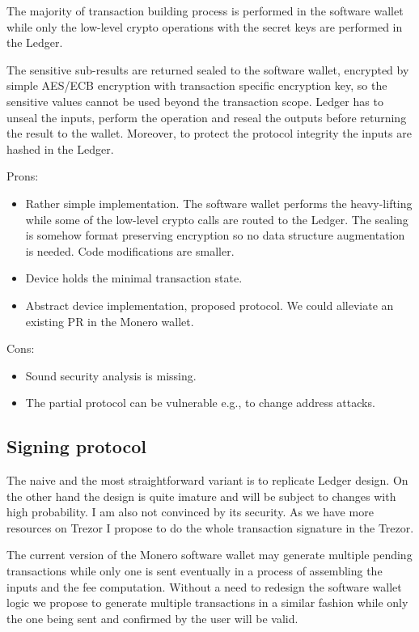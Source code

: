 \documentclass[]{article}
\begin{document}
The majority of transaction building process is performed in the software wallet while only the low-level crypto operations with the secret keys are performed in the Ledger.  

The sensitive sub-results are returned sealed to the software wallet, encrypted by simple AES/ECB encryption with transaction specific encryption key, so the sensitive values cannot be used beyond the transaction scope. Ledger has to unseal the inputs, perform the operation and reseal the outputs before returning the result to the wallet. Moreover, to protect the protocol integrity the inputs are hashed in the Ledger. 

\;
\noindent Prons:
\begin{itemize}
	\item Rather simple implementation. The software wallet performs the heavy-lifting while some of the 
	low-level crypto calls are routed to the Ledger. The sealing is somehow format preserving encryption so no data structure augmentation is needed. Code modifications are smaller.
	\item Device holds the minimal transaction state.
	\item Abstract device implementation, proposed protocol. We could alleviate an existing PR\cite{ledger_pr} in the Monero wallet.
\end{itemize}

\noindent Cons:
\begin{itemize}
	\item Sound security analysis is missing. 
	\item The partial protocol can be vulnerable e.g., to change address attacks.
\end{itemize}

\noindent 

\subsection{Signing protocol}

The naive and the most straightforward variant is to replicate Ledger design. On the other hand the design is quite imature and will be subject to changes with high probability. I am also not convinced by its security. As we have more resources on Trezor I propose to do the whole transaction signature in the Trezor.

The current version of the Monero software wallet may generate multiple pending transactions while only one is sent eventually in a process of assembling the inputs and the fee computation. Without a need to redesign the software wallet logic we propose to generate multiple transactions in a similar fashion while only the one being sent and confirmed by the user will be valid. 
\end{document}
